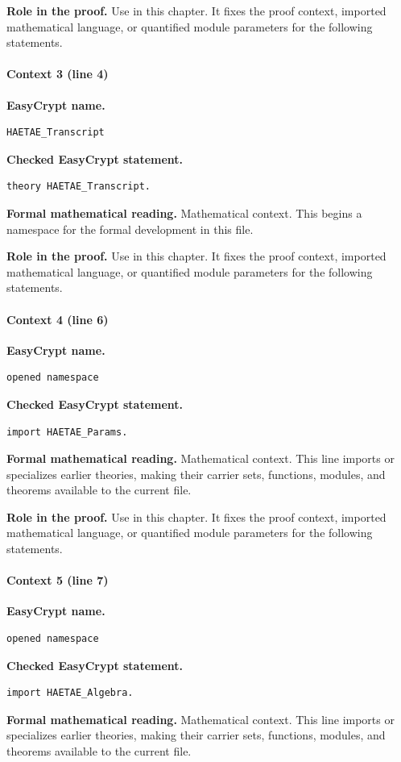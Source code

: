 \noindent\textbf{Role in the proof.}
Use in this chapter. It fixes the proof context, imported mathematical language, or quantified module parameters for the following statements.

\paragraph{Context 3 (line 4)}
\noindent\textbf{EasyCrypt name.}
\begin{lstlisting}[language=EasyCrypt,basicstyle=\ttfamily\scriptsize]
HAETAE_Transcript
\end{lstlisting}
\noindent\textbf{Checked EasyCrypt statement.}
\begin{lstlisting}[language=EasyCrypt,basicstyle=\ttfamily\scriptsize]
theory HAETAE_Transcript.
\end{lstlisting}
\noindent\textbf{Formal mathematical reading.}
Mathematical context. This begins a namespace for the formal development in this file.

\noindent\textbf{Role in the proof.}
Use in this chapter. It fixes the proof context, imported mathematical language, or quantified module parameters for the following statements.

\paragraph{Context 4 (line 6)}
\noindent\textbf{EasyCrypt name.}
\begin{lstlisting}[language=EasyCrypt,basicstyle=\ttfamily\scriptsize]
opened namespace
\end{lstlisting}
\noindent\textbf{Checked EasyCrypt statement.}
\begin{lstlisting}[language=EasyCrypt,basicstyle=\ttfamily\scriptsize]
import HAETAE_Params.
\end{lstlisting}
\noindent\textbf{Formal mathematical reading.}
Mathematical context. This line imports or specializes earlier theories, making their carrier sets, functions, modules, and theorems available to the current file.

\noindent\textbf{Role in the proof.}
Use in this chapter. It fixes the proof context, imported mathematical language, or quantified module parameters for the following statements.

\paragraph{Context 5 (line 7)}
\noindent\textbf{EasyCrypt name.}
\begin{lstlisting}[language=EasyCrypt,basicstyle=\ttfamily\scriptsize]
opened namespace
\end{lstlisting}
\noindent\textbf{Checked EasyCrypt statement.}
\begin{lstlisting}[language=EasyCrypt,basicstyle=\ttfamily\scriptsize]
import HAETAE_Algebra.
\end{lstlisting}
\noindent\textbf{Formal mathematical reading.}
Mathematical context. This line imports or specializes earlier theories, making their carrier sets, functions, modules, and theorems available to the current file.

